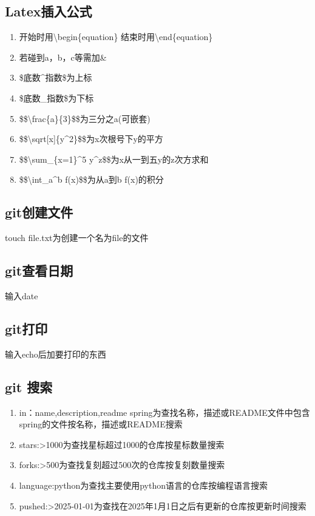 \documentclass{article}
\begin{document}
\subsection{Latex插入公式}
\begin{enumerate}
\item 开始时用\textbackslash{begin\{equation\}}\newline
 结束时用\textbackslash{end\{equation\}}\newline
\item 若碰到a，b，c等需加\&\newline
\item \$底数\^{}指数\$为上标\newline
\item \$底数\_指数\$为下标\newline
\item \$\$\textbackslash{frac\{a\}\{3\}}\$\$为三分之a(可嵌套)\newline
\item \$\$\textbackslash{sqrt[x]\{y\^{}2\}}\$\$为x次根号下y的平方\newline
\item \$\$\textbackslash{}sum\_\{x=1\}\^{}5 y\^{}z\$\$为x从一到五y的z次方求和\newline
\item \$\$\textbackslash{}int\_a\^{}b f(x)\$\$为从a到b f(x)的积分
\end{enumerate}
\subsection{git创建文件 }
touch file.txt为创建一个名为file的文件
\subsection{git查看日期 }
输入date
\subsection{git打印}
输入echo后加要打印的东西
\subsection{git 搜索}
\begin{enumerate}
\item in：name,description,readme spring为查找名称，描述或README文件中包含spring的文件按名称，描述或README搜索\newline
\item stars:>1000为查找星标超过1000的仓库按星标数量搜索\newline
\item forks:>500为查找复刻超过500次的仓库按复刻数量搜索\newline
\item language:python为查找主要使用python语言的仓库按编程语言搜索\newline
\item pushed:>2025-01-01为查找在2025年1月1日之后有更新的仓库按更新时间搜索\newline
\end{enumerate}
\end{document}
